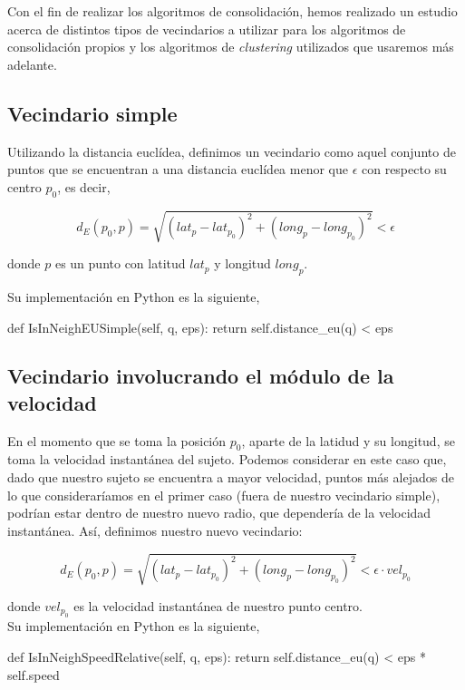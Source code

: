 \documentclass[a4paper, 12pt]{article}
\begin{document}
Con el fin de realizar los algoritmos de consolidaci\'on, hemos realizado un estudio acerca de distintos tipos de vecindarios a utilizar para los algoritmos de consolidaci\'on propios y los algoritmos de \textit{clustering} utilizados que usaremos m\'as adelante.

\subsection{Vecindario simple}

Utilizando la distancia eucl\'idea, definimos un vecindario como aquel conjunto de puntos que se  encuentran a una distancia eucl\'idea menor que $\epsilon$ con respecto su centro $p_0$, es decir,

$$ d_E(p_0, p) = \sqrt{(lat_{p} - lat_{p_0})^2 + (long_{p} - long_{p_0})^2 } < \epsilon $$

donde $p$ es un punto con latitud $lat_{p}$ y longitud $long_{p}$.

Su implementaci\'on en Python es la siguiente,

\begin{python}
        def IsInNeighEUSimple(self, q, eps):
                return self.distance_eu(q) < eps
\end{python}


\subsection{Vecindario involucrando el m\'odulo de la velocidad}

En el momento que se toma la posici\'on $p_0$, aparte de la latidud y su longitud, se toma la velocidad instant\'anea del sujeto. Podemos considerar en este caso que, dado que nuestro sujeto se  encuentra a mayor velocidad, puntos m\'as alejados de lo que considerar\'iamos en el primer caso (fuera de nuestro vecindario simple), podr\'ian estar dentro de nuestro nuevo radio, que depender\'ia de la velocidad instant\'anea. As\'i, definimos nuestro nuevo vecindario:

$$ d_E(p_0, p) = \sqrt{(lat_{p} - lat_{p_0})^2 + (long_{p} - long_{p_0})^2 } < \epsilon \cdot vel_{p_0} $$

donde $vel_{p_0}$ es la velocidad instant\'anea de nuestro punto centro.\\


Su implementaci\'on en Python es la siguiente,\\

\begin{python}
        def IsInNeighSpeedRelative(self, q, eps):
                return self.distance_eu(q) < eps * self.speed
\end{python}
\end{document}
